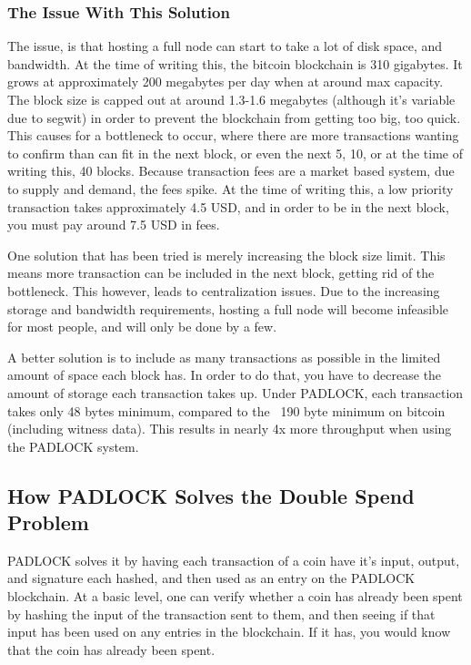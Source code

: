 \documentclass[12pt, letterpaper]{article}
\begin{document}
\subsubsection{The Issue With This Solution}
The issue, is that hosting a full node can start to take a lot of disk space,
and bandwidth. At the time of writing this, the bitcoin blockchain is 310
gigabytes. It grows at approximately 200 megabytes per day when at around max
capacity. The block size is capped out at around 1.3-1.6 megabytes (although
it's variable due to segwit) in order to prevent the blockchain from getting too
big, too quick. This causes for a bottleneck to occur, where there are more
transactions wanting to confirm than can fit in the next block, or even the next
5, 10, or at the time of writing this, 40 blocks. Because transaction fees are a
market based system, due to supply and demand, the fees spike. At the time of
writing this, a low priority transaction takes approximately 4.5 USD, and in
order to be in the next block, you must pay around 7.5 USD in fees.

One solution that has been tried is merely increasing the block size limit. This
means more transaction can be included in the next block, getting rid of the
bottleneck. This however, leads to centralization issues. Due to the increasing
storage and bandwidth requirements, hosting a full node will become infeasible
for most people, and will only be done by a few.

A better solution is to include as many transactions as possible in the limited
amount of space each block has. In order to do that, you have to decrease the
amount of storage each transaction takes up. Under PADLOCK, each transaction
takes only 48 bytes minimum, compared to the ~190 byte minimum on bitcoin
(including witness data). This results in nearly 4x more throughput when using
the PADLOCK system.

\subsection{How PADLOCK Solves the Double Spend Problem}
PADLOCK solves it by having each transaction of a coin have it's input, output,
and signature each hashed, and then used as an entry on the PADLOCK blockchain.
At a basic level, one can verify whether a coin has already been spent by
hashing the input of the transaction sent to them, and then seeing if that input
has been used on any entries in the blockchain. If it has, you would know that
the coin has already been spent.
\end{document}
